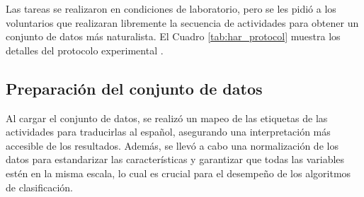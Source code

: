 \documentclass{esannV2}
\begin{document}
\begin{table}[h!]
    \centering
    \caption{Protocolo de actividades para el Experimento RAH.}
    \label{tab:har_protocol}
\end{table}

Las tareas se realizaron en condiciones de laboratorio, pero se les pidió a los voluntarios que realizaran libremente la secuencia de actividades para obtener un conjunto de datos más naturalista. El Cuadro \ref{tab:har_protocol} muestra los detalles del protocolo experimental \cite{esann2013}.


\subsection{Preparación del conjunto de datos}

Al cargar el conjunto de datos, se realizó un mapeo de las etiquetas de las actividades para traducirlas al español, asegurando una interpretación más accesible de los resultados. Además, se llevó a cabo una normalización de los datos para estandarizar las características y garantizar que todas las variables estén en la misma escala, lo cual es crucial para el desempeño de los algoritmos de clasificación.
\end{document}
